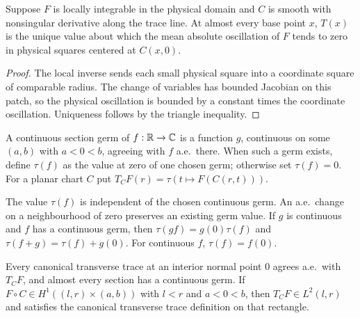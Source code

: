 \begin{lemma}
\label{lem:interior-trace-physical-averages}
\leanok
Suppose $F$ is locally integrable in the physical domain and $C$ is smooth
with nonsingular derivative along the trace line. At almost every base point
$x$, $T(x)$ is the unique value about which the mean absolute oscillation
of $F$ tends to zero in physical squares centered at $C(x,0)$.
\end{lemma}
\begin{proof}
\leanok
The local inverse sends each small physical square into a coordinate
square of comparable radius. The change of variables has bounded Jacobian
on this patch, so the physical oscillation is bounded by a constant times
the coordinate oscillation. Uniqueness follows by the triangle inequality.
\end{proof}

\begin{definition}
\label{def:interior-section-trace}
\leanok
A continuous section germ of $f:\mathbb{R}\to\mathbb{C}$ is a function $g$, continuous on
some $(a,b)$ with $a<0<b$, agreeing with $f$ a.e.\ there.
When such a germ exists, define $\tau(f)$ as the value at zero of one
chosen germ; otherwise set $\tau(f)=0$.
For a planar chart $C$ put
$T_C F(r)=\tau(t\mapsto F(C(r,t)))$.
\end{definition}

\begin{lemma}
\label{lem:interior-section-trace}
\leanok
The value $\tau(f)$ is independent of the chosen continuous germ.
An a.e.\ change on a neighbourhood of zero preserves an existing germ value.
If $g$ is continuous and $f$ has a continuous germ, then
$\tau(gf)=g(0)\tau(f)$ and $\tau(f+g)=\tau(f)+g(0)$.
For continuous $f$, $\tau(f)=f(0)$.

Every canonical transverse trace at an interior normal point $0$ agrees
a.e.\ with $T_C F$, and almost every section has a continuous germ.
If $F\circ C\in H^1((l,r)\times(a,b))$ with $l<r$ and $a<0<b$, then
$T_C F\in L^2(l,r)$ and satisfies the canonical transverse trace definition
on that rectangle.
\end{lemma}

